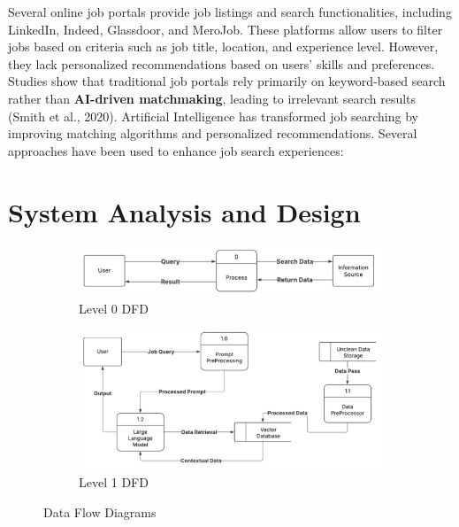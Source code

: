 \documentclass[a4paper,12pt]{report}
\begin{document}
        Several online job portals provide job listings and search functionalities, 
        including LinkedIn, Indeed, Glassdoor, and MeroJob. These platforms allow users to filter jobs based on criteria such as job title, location, and experience level. However, they lack personalized recommendations based on users’ skills and preferences. Studies show that traditional job portals rely primarily on keyword-based search rather than \textbf{AI-driven matchmaking}, leading to irrelevant search results (Smith et al., 2020).
        Artificial Intelligence has transformed job searching by improving matching algorithms and personalized recommendations. Several approaches have been used to enhance job search experiences:
        \newline
    \chapter{System Analysis and Design}
    \begin{figure}[h]
        \centering
        \begin{subfigure}{0.55\textwidth}
            \centering
            \includegraphics[width=\textwidth]{lvl0.png}
            \caption{Level 0 DFD}
            \label{fig:lvl0}
        \end{subfigure}
        \hfill
        \begin{subfigure}{0.45\textwidth}
            \centering
            \includegraphics[width=\textwidth]{lvl1.png}
            \caption{Level 1 DFD}
            \label{fig:lvl1}
        \end{subfigure}
        \caption{Data Flow Diagrams}
        \label{fig:dfd}
    \end{figure}

        
\end{document}
